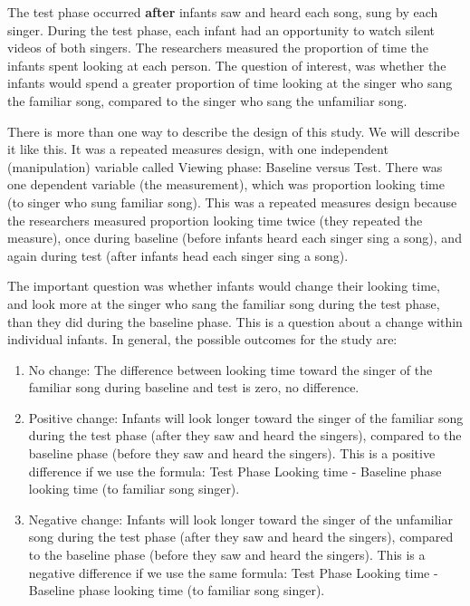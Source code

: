 \documentclass[]{book}
\begin{document}
The test phase occurred \textbf{after} infants saw and heard each song, sung by each singer. During the test phase, each infant had an opportunity to watch silent videos of both singers. The researchers measured the proportion of time the infants spent looking at each person. The question of interest, was whether the infants would spend a greater proportion of time looking at the singer who sang the familiar song, compared to the singer who sang the unfamiliar song.

There is more than one way to describe the design of this study. We will describe it like this. It was a repeated measures design, with one independent (manipulation) variable called Viewing phase: Baseline versus Test. There was one dependent variable (the measurement), which was proportion looking time (to singer who sung familiar song). This was a repeated measures design because the researchers measured proportion looking time twice (they repeated the measure), once during baseline (before infants heard each singer sing a song), and again during test (after infants head each singer sing a song).

The important question was whether infants would change their looking time, and look more at the singer who sang the familiar song during the test phase, than they did during the baseline phase. This is a question about a change within individual infants. In general, the possible outcomes for the study are:

\begin{enumerate}
\def\labelenumi{\arabic{enumi}.}
\item
  No change: The difference between looking time toward the singer of the familiar song during baseline and test is zero, no difference.
\item
  Positive change: Infants will look longer toward the singer of the familiar song during the test phase (after they saw and heard the singers), compared to the baseline phase (before they saw and heard the singers). This is a positive difference if we use the formula: Test Phase Looking time - Baseline phase looking time (to familiar song singer).
\item
  Negative change: Infants will look longer toward the singer of the unfamiliar song during the test phase (after they saw and heard the singers), compared to the baseline phase (before they saw and heard the singers). This is a negative difference if we use the same formula: Test Phase Looking time - Baseline phase looking time (to familiar song singer).
\end{enumerate}
\end{document}
